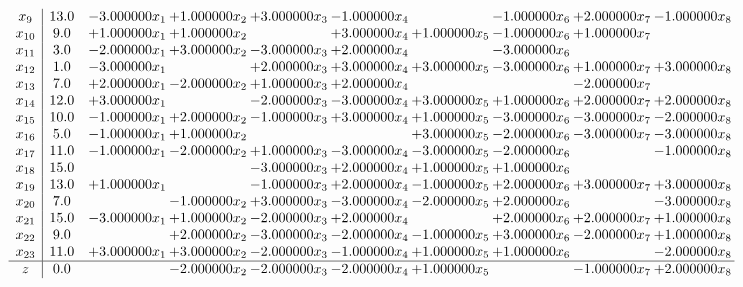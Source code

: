 \documentclass[10pt]{article}
\begin{document}
\[\begin{array}{c| c c@{\hskip 2pt} c@{\hskip 2pt} c@{\hskip 2pt} c@{\hskip 2pt} c@{\hskip 2pt} c@{\hskip 2pt} c@{\hskip 2pt} c@{\hskip 2pt} }
 x_{9}   &  13.0 & -3.000000 x_{1} & + 1.000000 x_{2} & + 3.000000 x_{3} & -1.000000 x_{4} &   & -1.000000 x_{6} & + 2.000000 x_{7} & -1.000000 x_{8}\\
 x_{10}   &  9.0 & + 1.000000 x_{1} & + 1.000000 x_{2} &   & + 3.000000 x_{4} & + 1.000000 x_{5} & -1.000000 x_{6} & + 1.000000 x_{7} &   \\
 x_{11}   &  3.0 & -2.000000 x_{1} & + 3.000000 x_{2} & -3.000000 x_{3} & + 2.000000 x_{4} &   & -3.000000 x_{6} &    &   \\
 x_{12}   &  1.0 & -3.000000 x_{1} &   & + 2.000000 x_{3} & + 3.000000 x_{4} & + 3.000000 x_{5} & -3.000000 x_{6} & + 1.000000 x_{7} & + 3.000000 x_{8}\\
 x_{13}   &  7.0 & + 2.000000 x_{1} & -2.000000 x_{2} & + 1.000000 x_{3} & + 2.000000 x_{4} &    &   & -2.000000 x_{7} &   \\
 x_{14}   &  12.0 & + 3.000000 x_{1} &   & -2.000000 x_{3} & -3.000000 x_{4} & + 3.000000 x_{5} & + 1.000000 x_{6} & + 2.000000 x_{7} & + 2.000000 x_{8}\\
 x_{15}   &  10.0 & -1.000000 x_{1} & + 2.000000 x_{2} & -1.000000 x_{3} & + 3.000000 x_{4} & + 1.000000 x_{5} & -3.000000 x_{6} & -3.000000 x_{7} & -2.000000 x_{8}\\
 x_{16}   &  5.0 & -1.000000 x_{1} & + 1.000000 x_{2} &    &   & + 3.000000 x_{5} & -2.000000 x_{6} & -3.000000 x_{7} & -3.000000 x_{8}\\
 x_{17}   &  11.0 & -1.000000 x_{1} & -2.000000 x_{2} & + 1.000000 x_{3} & -3.000000 x_{4} & -3.000000 x_{5} & -2.000000 x_{6} &   & -1.000000 x_{8}\\
 x_{18}   &  15.0  &    &   & -3.000000 x_{3} & + 2.000000 x_{4} & + 1.000000 x_{5} & + 1.000000 x_{6} &    &   \\
 x_{19}   &  13.0 & + 1.000000 x_{1} &   & -1.000000 x_{3} & + 2.000000 x_{4} & -1.000000 x_{5} & + 2.000000 x_{6} & + 3.000000 x_{7} & + 3.000000 x_{8}\\
 x_{20}   &  7.0  &   & -1.000000 x_{2} & + 3.000000 x_{3} & -3.000000 x_{4} & -2.000000 x_{5} & + 2.000000 x_{6} &   & -3.000000 x_{8}\\
 x_{21}   &  15.0 & -3.000000 x_{1} & + 1.000000 x_{2} & -2.000000 x_{3} & + 2.000000 x_{4} &   & + 2.000000 x_{6} & + 2.000000 x_{7} & + 1.000000 x_{8}\\
 x_{22}   &  9.0  &   & + 2.000000 x_{2} & -3.000000 x_{3} & -2.000000 x_{4} & -1.000000 x_{5} & + 3.000000 x_{6} & -2.000000 x_{7} & + 1.000000 x_{8}\\
 x_{23}   &  11.0 & + 3.000000 x_{1} & + 3.000000 x_{2} & -2.000000 x_{3} & -1.000000 x_{4} & + 1.000000 x_{5} & + 1.000000 x_{6} &   & -2.000000 x_{8}\\
\hline
z    &  0.0  &   & -2.000000 x_{2} & -2.000000 x_{3} & -2.000000 x_{4} & + 1.000000 x_{5} &   & -1.000000 x_{7} & + 2.000000 x_{8}\\
\end{array}\]
\end{document}
